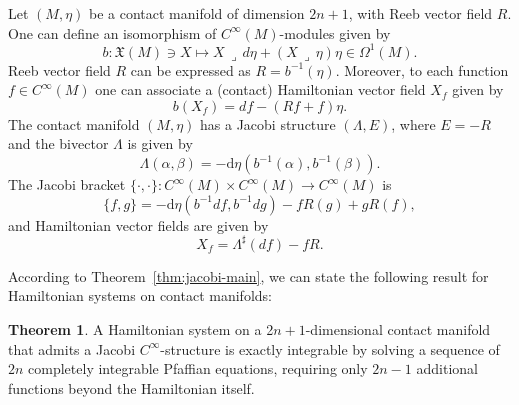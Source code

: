 \documentclass{article}
\theoremstyle{remark}
\theoremstyle{definition}
\newtheorem{theorem}{Theorem}[section]
\newcommand{\contract}{\,\lrcorner\,}
\begin{document}
Let $(M,\eta)$ be a contact manifold of dimension $2n+1$, with Reeb vector field
$R$. 
One can define an isomorphism of \(C^\infty(M)\)-modules given by
\[b : \mathfrak{X}(M) \ni X \mapsto X\contract d\eta + (X\contract\eta)\eta \in \Omega^1(M).\]
 Reeb vector field \(R\) can be expressed as \(R = b^{-1}(\eta)\). Moreover, to each function \(f \in C^\infty(M)\) one can associate a (contact) Hamiltonian vector field \(X_f\) given by 
\[b(X_f) = df - (Rf + f)\eta.\]
The contact manifold \((M, \eta)\) has a Jacobi structure \((\Lambda, E)\), where \(E = -R\) and the bivector \(\Lambda\) is given by 
\[\Lambda(\alpha, \beta) = -\mathrm{d}\eta(b^{-1}(\alpha), b^{-1}(\beta)).\]
The Jacobi bracket \(\{ \cdot , \cdot \} : C^{\infty}(M) \times C^{\infty}(M) \to C^{\infty}(M)\) is
\[ \{f, g\} = -\mathrm{d}\eta\left(b^{-1}df, b^{-1}dg\right) - fR(g) + gR(f),\]
and Hamiltonian vector
fields  are given by
\[
X_f=\Lambda^\sharp(df)-fR.
\]

According to Theorem~\ref{thm:jacobi-main}, we can state the following result for Hamiltonian systems on contact manifolds:
\begin{theorem}\label{ConC}
A Hamiltonian system on a 2$n+1$-dimensional  contact manifold that admits a Jacobi $C^\infty$-structure is exactly integrable by solving a
sequence of $2n$ completely integrable Pfaffian equations, requiring only $2n-1$ additional functions beyond the Hamiltonian itself.
\end{theorem}
\end{document}
